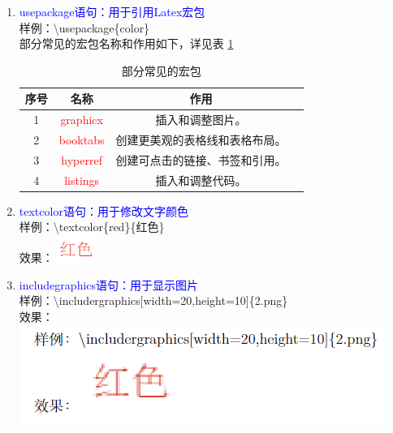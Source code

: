 \documentclass[12pt,a4paper,UTF8]{article}
\begin{document}
    \begin{enumerate}
        \item \textcolor{blue}{usepackage语句：用于引用Latex宏包}\\
        样例：\textbackslash usepackage\{color\}\\[8pt]
        部分常见的宏包名称和作用如下，详见表 \ref{broomsticks}
        \begin{table}[htbp]
            \centering
            \begin{tabular}{cccc}
                \toprule
                序号 & 名称 & 作用 \\
                \midrule
                1 & \textcolor{red}{graphicx} & 插入和调整图片。 \\
                2 & \textcolor{red}{booktabs} & 创建更美观的表格线和表格布局。 \\
                3 & \textcolor{red}{hyperref} & 创建可点击的链接、书签和引用。 \\
                4 & \textcolor{red}{listings} & 插入和调整代码。 \\
                \bottomrule
            \end{tabular}
            \caption{部分常见的宏包}
            \label{broomsticks}
        \end{table}
        
        \item \textcolor{blue}{textcolor语句：用于修改文字颜色}\\
        样例：\textbackslash textcolor\{red\}\{红色\}\\
        效果：\includegraphics{pictures/Latex/2.png}

        \item \textcolor{blue}{includegraphics语句：用于显示图片}\\
        样例：\textbackslash includergraphics[width=20,height=10]\{2.png\}\\
        效果：\\
        \includegraphics[scale=0.75]{pictures/Latex/3.png}


\end{enumerate}
\end{document}
